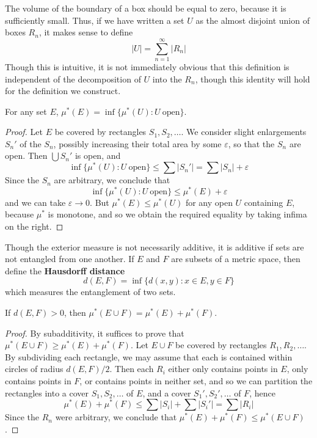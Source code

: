 The volume of the boundary of a box should be equal to zero, because it is sufficiently small. Thus, if we have written a set $U$ as the almost disjoint union of boxes $R_n$, it makes sense to define
%
\[ |U| = \sum_{n = 1}^\infty |R_n| \]
%
Though this is intuitive, it is not immediately obvious that this definition is independent of the decomposition of $U$ into the $R_n$, though this identity will hold for the definition we construct.

\begin{corollary}
  For any set $E$, $\mu^*(E) = \inf \{ \mu^*(U): U\ \text{open} \}$.
\end{corollary}
\begin{proof}
  Let $E$ be covered by rectangles $S_1, S_2, \dots$. We consider slight enlargements $S_n'$ of the $S_n$, possibly increasing their total area by some $\varepsilon$, so that the $S_n$ are open. Then $\bigcup S_n'$ is open, and
  \[ \inf \{ \mu^*(U): U\ \text{open} \} \leq \sum |S_n'| = \sum |S_n| + \varepsilon \]
  Since the $S_n$ are arbitrary, we conclude that
  \[ \inf \{ \mu^*(U): U\ \text{open} \} \leq \mu^*(E) + \varepsilon \]
  and we can take $\varepsilon \to 0$. But $\mu^*(E) \leq \mu^*(U)$ for any open $U$ containing $E$, because $\mu^*$ is monotone, and so we obtain the required equality by taking infima on the right.
\end{proof}

Though the exterior measure is not necessarily additive, it is additive if sets are not entangled from one another. If $E$ and $F$ are subsets of a metric space, then define the {\bf Hausdorff distance}
%
\[ d(E,F) = \inf \{ d(x,y) : x \in E, y \in F \} \]
%
which measures the entanglement of two sets.

\begin{theorem}
  If $d(E,F) > 0$, then $\mu^*(E \cup F) = \mu^*(E) + \mu^*(F)$.
\end{theorem}
\begin{proof}
  By subadditivity, it suffices to prove that $\mu^*(E \cup F) \geq \mu^*(E) + \mu^*(F)$. Let $E \cup F$ be covered by rectangles $R_1, R_2, \dots$. By subdividing each rectangle, we may assume that each is contained within circles of radius $d(E,F)/2$. Then each $R_i$ either only contains points in $E$, only contains points in $F$, or contains points in neither set, and so we can partition the rectangles into a cover $S_1, S_2, \dots$ of $E$, and a cover $S_1', S_2', \dots$ of $F$, hence
  \[ \mu^*(E) + \mu^*(F) \leq \sum |S_i| + \sum |S_i'| = \sum |R_i| \]
  Since the $R_n$ were arbitrary, we conclude that $\mu^*(E) + \mu^*(F) \leq \mu^*(E \cup F)$.
\end{proof}

